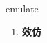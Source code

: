 
\begin{frame}
{\huge emulate}
\begin{center}
\begin{enumerate}\Large
  \item \textbf{效仿}
\end{enumerate}
\end{center}
\end{frame}
